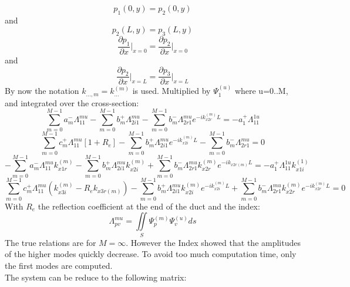\begin{equation}
    p_1(0,y)=p_2(0,y)
\end{equation}
and
\begin{equation}
    p_2(L,y)=p_3(L,y)
\end{equation}
\begin{equation}
    \frac{\partial p_1}{\partial x}\Bigg|_{x=0}=\frac{\partial p_2}{\partial x}\Bigg|_{x=0}
\end{equation}
and
\begin{equation}
    \frac{\partial p_2}{\partial x}\Bigg|_{x=L}=\frac{\partial p_3}{\partial x}\Bigg|_{x=L}
\end{equation}
By now the notation $k_{...,m}=k_{...}^{(m)}$ is used.
Multiplied by $\Psi_1^{(u)}$ where u=0..M, and integrated over the cross-section: 
\begin{equation}
    \sum_{m=0}^{M-1} a_m^-\Lambda_{11}^{mu}-\sum_{m=0}^{M-1} b_m^+\Lambda_{2i1}^{mu}-\sum_{m=0}^{M-1} b_m^-\Lambda_{2r1}^{mu}e^{-ik_{x2r}^{(m)}L}=-a_1^+\Lambda_{11}^{1u}
\end{equation}
\begin{equation}
    \sum_{m=0}^{M-1} c_m^+\Lambda_{11}^{mu}[1+R_e]-\sum_{m=0}^{M-1} b_m^+\Lambda_{2i1}^{mu}e^{-ik_{x2i}^{(m)}L}-\sum_{m=0}^{M-1} b_m^-\Lambda_{2r1}^{mu}=0
\end{equation}
\begin{equation}
    -\sum_{m=0}^{M-1} a_m^-\Lambda_{11}^{mu}k_{x1r}^{(m)}-\sum_{m=0}^{M-1} b_m^+\Lambda_{2i1}^{mu}k_{x2i}^{(m)}+\sum_{m=0}^{M-1} b_m^-\Lambda_{2r1}^{mu}k_{x2r}^{(m)}e^{-ik_{x2r(m)}L}=-a_1^+\Lambda_{11}^{1u}k_{x1i}^{(1)}
\end{equation}
\begin{equation}
    \sum_{m=0}^{M-1} c_m^+\Lambda_{11}^{mu}(k_{x3i}^{(m)}-R_ek_{x3r(m)})-\sum_{m=0}^{M-1} b_m^+\Lambda_{2i1}^{mu}k_{x2i}^{(m)}e^{-ik_{x2i}^{(m)}L}+\sum_{m=0}^{M-1} b_m^-\Lambda_{2r1}^{mu}k_{x2r}^{(m)}e^{-ik_{x2r}^{(m)}L}=0
\end{equation}
With $R_e$ the reflection coefficient at the end of the duct and the index:
\begin{equation}
    \Lambda_{pv}^{mu}=\iint \limits_S \Psi_p^{(m)} \Psi_v^{(u)} ds
\end{equation}
The true relations are for $M=\infty$. However the Index showed that the amplitudes of the higher modes quickly decrease. To avoid too much computation time, only the first modes are computed.\\
The system can be reduce to the following matrix:
